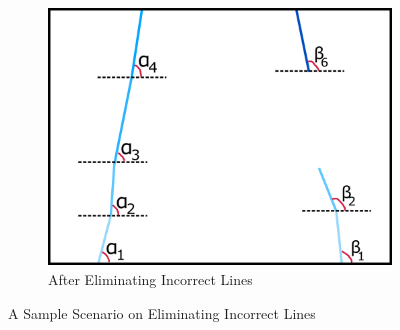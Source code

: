 \documentclass[a4paper,12pt]{article}
\begin{document}
\begin{enumerate}[A.]
\begin{figure}[t!]
\begin{subfigure}{.46\textwidth}
\includegraphics[width=0.44\unitlength]{images/dataP_explained2}

\caption{\label{fig:dataP_explained2} After Eliminating Incorrect Lines}

\end{subfigure}

\caption{\label{fig:dataP_explained} A Sample Scenario on Eliminating Incorrect Lines}

\end{figure}






\end{enumerate}
\end{document}
